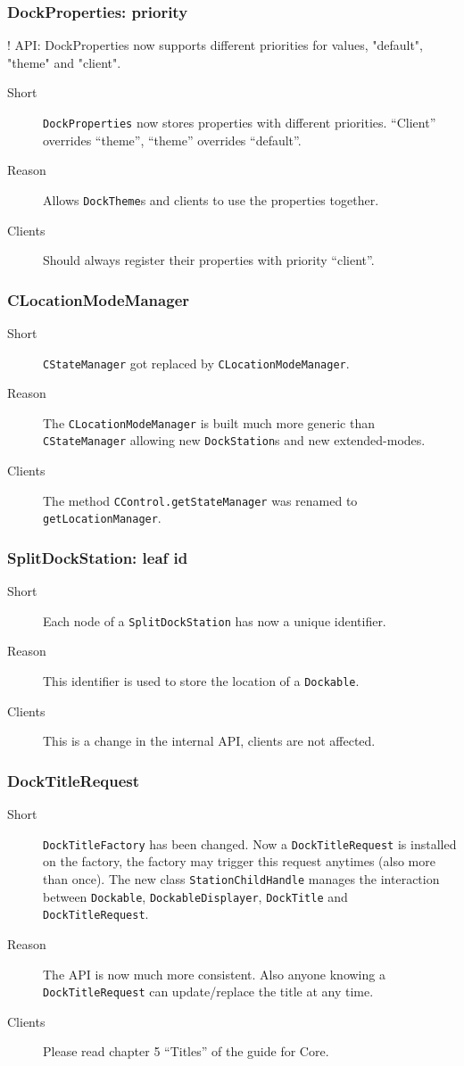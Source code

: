 \documentclass[a4paper,10pt]{article}
\newcommand{\src}[1]{\lstinline[basicstyle=\normalsize\ttfamily,keywordstyle=\normalsize\ttfamily,identifierstyle=\normalsize\ttfamily]|#1|}
\newcommand{\short}{\item[Short]}
\newcommand{\why}{\item[Reason]}
\newcommand{\clients}{\item[Clients]}
\begin{document}
\subsubsection{DockProperties: priority}
! API: DockProperties now supports different priorities for values, "default", "theme" and "client".
\begin{description}
 \short \src{DockProperties} now stores properties with different priorities. ``Client'' overrides ``theme'', ``theme'' overrides ``default''.
 \why Allows \src{DockTheme}s and clients to use the properties together.
 \clients Should always register their properties with priority ``client''.
\end{description}

\subsubsection{CLocationModeManager}
\begin{description}
 \short \src{CStateManager} got replaced by \src{CLocationModeManager}.
 \why The \src{CLocationModeManager} is built much more generic than \src{CStateManager} allowing new \src{DockStation}s and new extended-modes.
 \clients The method \src{CControl.getStateManager} was renamed to \src{getLocationManager}.
\end{description}

\subsubsection{SplitDockStation: leaf id}
\begin{description}
 \short Each node of a \src{SplitDockStation} has now a unique identifier.
 \why This identifier is used to store the location of a \src{Dockable}.
 \clients This is a change in the internal API, clients are not affected.
\end{description}

\subsubsection{DockTitleRequest}
\begin{description}
 \short \src{DockTitleFactory} has been changed. Now a \src{DockTitleRequest} is installed on the factory, the factory may trigger this request anytimes (also more than once). The new class \src{StationChildHandle} manages the interaction between \src{Dockable}, \src{DockableDisplayer}, \src{DockTitle} and \src{DockTitleRequest}.
 \why The API is now much more consistent. Also anyone knowing a \src{DockTitleRequest} can update/replace the title at any time.
 \clients Please read chapter 5 ``Titles'' of the guide for Core.
\end{description}
\end{document}
